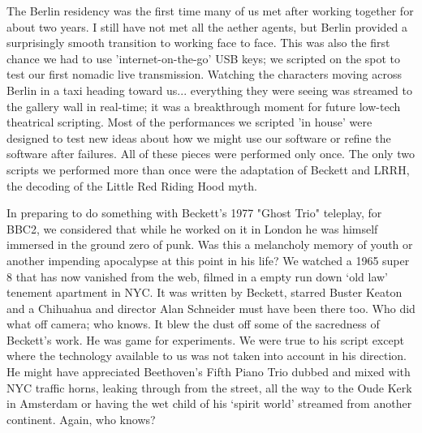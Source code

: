 The Berlin residency was the first time many of us met after working together for about two years. I still have not met all the aether agents, but Berlin provided a surprisingly smooth transition to working face to face. This was also the first chance we had to use 'internet-on-the-go' USB keys; we scripted on the spot to test our first nomadic live transmission. Watching the characters moving across Berlin in a taxi heading toward us... everything they were seeing was streamed to the gallery wall in real-time; it was a breakthrough moment for future low-tech theatrical scripting. Most of the performances we scripted 'in house' were designed to test new ideas about how we might use our software or refine the software after failures. All of these pieces were performed only once. The only two scripts we performed more than once were the adaptation of Beckett and LRRH, the decoding of the Little Red Riding Hood myth.
 
In preparing to do something with Beckett’s 1977 "Ghost Trio" teleplay, for BBC2, we considered that while he worked on it in London he was himself immersed in the ground zero of punk. Was this a melancholy memory of youth or another impending apocalypse at this point in his life? We watched a 1965 super 8 that has now vanished from the web, filmed in a empty run down ‘old law’ tenement apartment in NYC. It was written by Beckett, starred Buster Keaton and a Chihuahua and director Alan Schneider must have been there too. Who did what off camera; who knows. It blew the dust off some of the sacredness of Beckett’s work. He was game for experiments. We were true to his script except where the technology available to us was not taken into account in his direction. He might have appreciated Beethoven’s Fifth Piano Trio dubbed and mixed with NYC traffic horns, leaking through from the street, all the way to the Oude Kerk in Amsterdam or having the wet child of his ‘spirit world’ streamed from another continent. Again, who knows?
 
